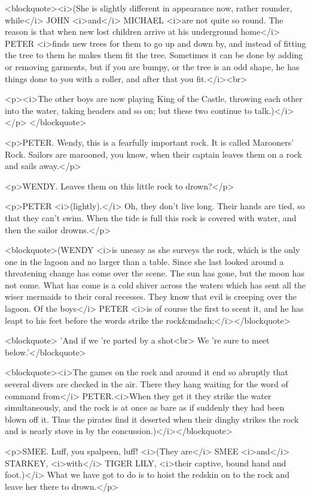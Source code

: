 <blockquote><i>(She is slightly different in appearance now, rather rounder, while</i> JOHN <i>and</i> MICHAEL <i>are not quite so round. The reason is that when new lost children arrive at his underground home</i> PETER <i>finds new trees for them to go up and down by, and instead of fitting the tree to them he makes them fit the tree. Sometimes it can be done by adding or removing garments, but if you are bumpy, or the tree is an odd shape, he has things done to you with a roller, and after that you fit.</i><br> 

<p><i>The other boys are now playing King of the Castle, throwing each other into the water, taking headers and so on; but these two continue to talk.)</i></p> </blockquote>

<p>PETER. Wendy, this is a fearfully important rock. It is called Marooners' Rock. Sailors are marooned, you know, when their captain leaves them on a rock and sails away.</p>

<p>WENDY. Leaves them on this little rock to drown?</p>

<p>PETER <i>(lightly).</i> Oh, they don't live long. Their hands are tied, so that they can't swim. When the tide is full this rock is covered with water, and then the sailor drowns.</p>

<blockquote>(WENDY <i>is uneasy as she surveys the rock, which is the only one in the lagoon and no larger than a table. Since she last looked around a threatening change has come over the scene. The sun has gone, but the moon has not come. What has come is a cold shiver across the waters which has sent all the wiser mermaids to their coral recesses. They know that evil is creeping over the lagoon. Of the boys</i> PETER <i>is of course the first to scent it, and he has leapt to his feet before the words strike the rock&mdash;</i></blockquote>

<blockquote> 'And if we 're parted by a shot<br> We 're sure to meet below.'</blockquote>

<blockquote><i>The games on the rock and around it end so abruptly that several divers are checked in the air. There they hang waiting for the word of command from</i> PETER.<i>When they get it they strike the water simultaneously, and the rock is at once as bare as if suddenly they had been blown off it. Thus the pirates find it deserted when their dinghy strikes the rock and is nearly stove in by the concussion.)</i></blockquote>

<p>SMEE. Luff, you spalpeen, luff! <i>(They are</i> SMEE <i>and</i> STARKEY, <i>with</i> TIGER LILY, <i>their captive, bound hand and foot.)</i> What we have got to do is to hoist the redskin on to the rock and leave her there to drown.</p>

